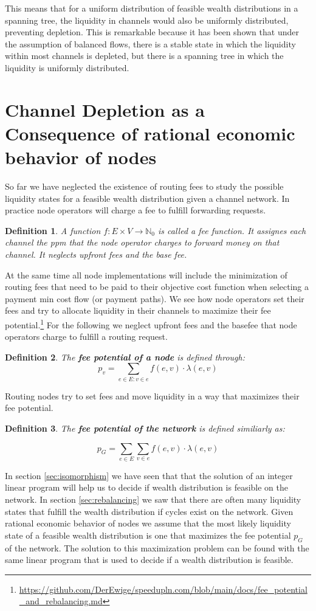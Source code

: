 \documentclass[10pt,twocolumn]{article}
\newtheorem{definition}{Definition}[section]
\begin{document}
This means that for a uniform distribution of feasible wealth distributions in a spanning tree, the liquidity in channels would also be uniformly distributed, preventing depletion. This is remarkable because it has been shown \cite{guidi2019steadystate} that under the assumption of balanced flows, there is a stable state in which the liquidity within most channels is depleted, but there is a spanning tree in which the liquidity is uniformly distributed.

\section{Channel Depletion as a Consequence of rational economic behavior of nodes}
\label{sec:depletion}
So far we have neglected the existence of routing fees to study the possible liquidity states for a feasible wealth distribution given a channel network.
In practice node operators will charge a fee to fulfill forwarding requests.
\begin{definition}
  A function $f:E\times V\longrightarrow \mathbb{N}_0$ is called a fee function. It assignes each channel the ppm that the node operator charges to forward money on that channel. It neglects upfront fees and the base fee.
\end{definition}
At the same time all node implementations will include the minimization of routing fees that need to be paid to their objective cost function when selecting a payment min cost flow (or payment paths).
We see how node operators set their fees and try to allocate liquidity in their channels to maximize their fee potential.\footnote{\url{https://github.com/DerEwige/speedupln.com/blob/main/docs/fee_potential_and_rebalancing.md}}
For the following we neglect upfront fees and the basefee that node operators charge to fulfill a routing request.
\begin{definition}
  The \textbf{fee potential of a node} is defined through:
  \[
  p_v=\sum_{e\in E:v\in e}f(e,v)\cdot\lambda(e,v)
  \]
\end{definition}

Routing nodes try to set fees and move liquidity in a way that maximizes their fee potential.
\begin{definition}
The \textbf{fee potential of the network} is defined similiarly as:

\begin{equation}
p_G=\sum_{e\in E}\sum_{v\in e}f(e,v)\cdot\lambda(e,v)
\end{equation}
\end{definition}
In section \ref{sec:isomorphism} we have seen that that the solution of an integer linear program will help us to decide if wealth distribution is feasible on the network.
In section \ref{sec:rebalancing} we saw that there are often many liquidity states that fulfill the wealth distribution if cycles exist on the network.
Given rational economic behavior of nodes we assume that the most likely liquidity state of a feasible wealth distribution is one that maximizes the fee potential $p_G$ of the network.
The solution to this maximization problem can be found with the same linear program that is used to decide if a wealth distribution is feasible.
\end{document}

